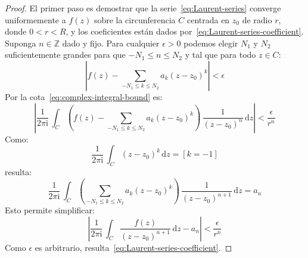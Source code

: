   \begin{proof}
    El primer paso es demostrar
    que la serie~\eqref{eq:Laurent-series}
    converge uniformemente a \(f(z)\)
    sobre la circunferencia \(C\)
    centrada en \(z_0\) de radio \(r\),
    donde \(0 < r < R\),
    y los coeficientes
    están dados por~\eqref{eq:Laurent-series-coefficient}.
    Suponga \(n \in \mathbb{Z}\) dado y fijo.
    Para cualquier \(\epsilon > 0\)
    podemos elegir \(N_1\) y \(N_2\)
    suficientemente grandes para que
    \(-N_1 \le n \le N_2\)
    y tal que para todo \(z \in C\):
    \begin{equation*}
      \left\lvert
	f(z)
	  - \sum_{-N_1 \le k \le N_2} a_k (z - z_0)^k
      \right\rvert
	< \epsilon
    \end{equation*}
    Por la cota~\eqref{eq:complex-integral-bound} es:
    \begin{equation*}
      \left\lvert
	\frac{1}{2 \pi \mathrm{i}} \,
	  \int_C
	    \left(
	      f(z)
	      - \sum_{-N_1 \le k \le N_2} a_k (z - z_0)^k
	    \right) \,
	      \frac{1}{(z - z_0)^n}
	      \, \mathrm{d} z
      \right\rvert
	<\frac{\epsilon}{r^n}
    \end{equation*}
    Como:
    \begin{equation*}
      \frac{1}{2 \pi \mathrm{i}}
	\, \int_C (z - z_0)^k \, \mathrm{d} z
	= [k = -1]
    \end{equation*}
    resulta:
    \begin{equation*}
      \frac{1}{2 \pi \mathrm{i}} \,
	\int_C
	  \left(
	    \sum_{-N_1 \le k \le N_2} a_k (z - z_0)^k
	  \right) \,
	    \frac{1}{(z - z_0)^{n + 1}}
	    \, \mathrm{d} z
       = a_n
    \end{equation*}
    Esto permite simplificar:
    \begin{equation*}
      \left\lvert
	\frac{1}{2 \pi \mathrm{i}} \,
	  \int_C \frac{f(z)}{(z - z_0)^{n + 1}} \, \mathrm{d} z
	  - a_n
      \right\rvert
	<\frac{\epsilon}{r^n}
    \end{equation*}
    Como \(\epsilon\) es arbitrario,
    resulta~\eqref{eq:Laurent-series-coefficient}.


\end{proof}
